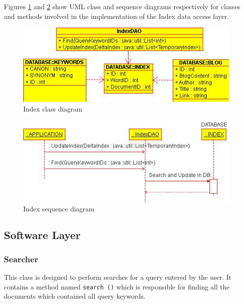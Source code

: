 \documentclass[10pt]{report}
\begin{document}
 Figures \ref{fig:indexclassdiagram} and
 \ref{fig:indexsequencediagram} show UML class and sequence
 diagrams respectively for classes and methods involved in the
 implementation of the Index data access layer.

\begin{figure}
  \begin{center}
        \includegraphics[width=\textwidth,height=!]{indexclassdiagram}
  \end{center}
  \caption{Index class diagram}
  \label{fig:indexclassdiagram}
\end{figure} 

\begin{figure}
  \begin{center}
        \includegraphics[width=\textwidth,height=!]{indexsequencediagram}
  \end{center}
  \caption{Index sequence diagram}
  \label{fig:indexsequencediagram}
\end{figure} 


\subsection{Software Layer}

\subsubsection{Searcher}
This class is designed to perform searches for a query entered by the
user. It contains a method named \texttt{search ()} which is responsible for
finding all the documents which contained all query keywords.
\end{document}
